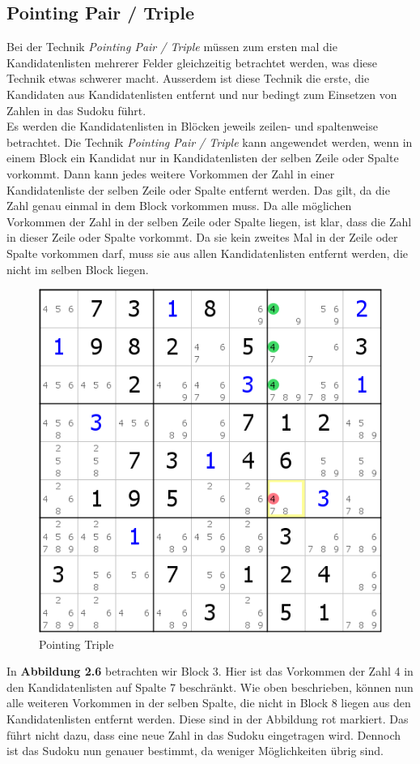 \newpage
\subsection{Pointing Pair / Triple}
Bei der Technik \textit{Pointing Pair / Triple} müssen zum ersten mal die Kandidatenlisten mehrerer Felder gleichzeitig betrachtet werden, was diese Technik etwas schwerer macht. Ausserdem ist diese Technik die erste, die Kandidaten aus Kandidatenlisten entfernt und nur bedingt zum Einsetzen von Zahlen in das Sudoku führt.\\
Es werden die Kandidatenlisten in Blöcken jeweils zeilen- und spaltenweise betrachtet. Die Technik \textit{Pointing Pair / Triple}
kann angewendet werden, wenn in einem Block ein Kandidat nur in Kandidatenlisten der selben Zeile oder Spalte vorkommt. Dann kann jedes weitere Vorkommen der Zahl in einer Kandidatenliste der selben Zeile oder Spalte entfernt werden. Das gilt, da die Zahl genau einmal in dem Block vorkommen muss. Da alle möglichen Vorkommen der Zahl in der selben Zeile oder Spalte liegen, ist klar, dass die Zahl in dieser Zeile oder Spalte vorkommt. Da sie kein zweites Mal in der Zeile oder Spalte vorkommen darf, muss sie aus allen Kandidatenlisten entfernt werden, die nicht im selben Block liegen.

\begin{figure}[h]
\begin{center}
\includegraphics{./img/pointing_triple.png}
\caption{Pointing Triple}
\end{center}
\end{figure}

\noindent In \textbf{Abbildung 2.6} betrachten wir Block 3. Hier ist das Vorkommen der Zahl 4 in den Kandidatenlisten auf Spalte 7 beschränkt. Wie oben beschrieben, können nun alle weiteren Vorkommen in der selben Spalte, die nicht in Block 8 liegen aus den Kandidatenlisten entfernt werden. Diese sind in der Abbildung rot markiert. Das führt nicht dazu, dass eine neue Zahl in das Sudoku eingetragen wird. Dennoch ist das Sudoku nun genauer bestimmt, da weniger Möglichkeiten übrig sind.